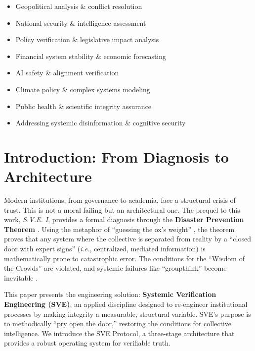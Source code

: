 \documentclass[11pt,a4paper]{article}
\theoremstyle{definition}
\begin{document}
\begin{small}
\begin{center}
\begin{minipage}{0.88\textwidth}
\begin{itemize}[nosep, itemsep=0.2em, topsep=0pt, leftmargin=1.5em]
    \item Geopolitical analysis \& conflict resolution
    \item National security \& intelligence assessment
    \item Policy verification \& legislative impact analysis
    \item Financial system stability \& economic forecasting
    \item AI safety \& alignment verification
    \item Climate policy \& complex systems modeling
    \item Public health \& scientific integrity assurance
    \item Addressing systemic disinformation \& cognitive security
\end{itemize}
\end{minipage}
\end{center}
\end{small}

\clearpage

\section{Introduction: From Diagnosis to Architecture}

Modern institutions, from governance to academia, face a structural crisis of trust. This is not a moral failing but an architectural one. The prequel to this work, \emph{S.V.E. I}, provides a formal diagnosis through the \textbf{Disaster Prevention Theorem} \citep{Kovnatsky2025SVE1}. Using the metaphor of ``guessing the ox's weight'' \citep{Galton1907}, the theorem proves that any system where the collective is separated from reality by a ``closed door with expert signs'' (\emph{i.e.}, centralized, mediated information) is mathematically prone to catastrophic error. The conditions for the ``Wisdom of the Crowds'' are violated, and systemic failures like ``groupthink'' become inevitable \citep{Surowiecki2004}.

This paper presents the engineering solution: \textbf{Systemic Verification Engineering (SVE)}, an applied discipline designed to re-engineer institutional processes by making integrity a measurable, structural variable. SVE's purpose is to methodically ``pry open the door,'' restoring the conditions for collective intelligence. We introduce the SVE Protocol, a three-stage architecture that provides a robust operating system for verifiable truth.
\end{document}
